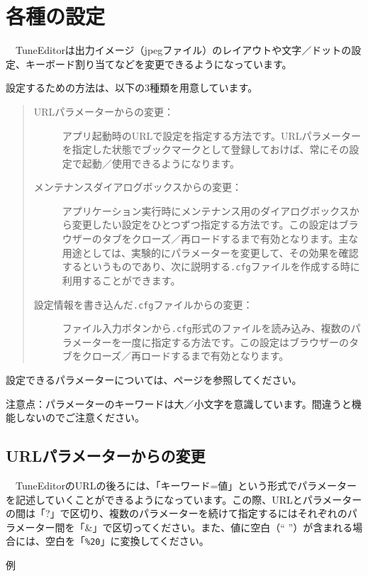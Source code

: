 \chapter{各種の設定}

　TuneEditorは出力イメージ（jpegファイル）のレイアウトや文字／ドットの設定、キーボード割り当てなどを変更できるようになっています。

設定するための方法は、以下の3種類を用意しています。

\begin{quote}
\begin{description}
\item[URLパラメーターからの変更：] アプリ起動時のURLで設定を指定する方法です。URLパラメーターを指定した状態でブックマークとして登録しておけば、常にその設定で起動／使用できるようになります。
\item[メンテナンスダイアログボックスからの変更：] アプリケーション実行時にメンテナンス用のダイアログボックスから変更したい設定をひとつずつ指定する方法です。この設定はブラウザーのタブをクローズ／再ロードするまで有効となります。主な用途としては、実験的にパラメーターを変更して、その効果を確認するというものであり、次に説明する\texttt{.cfg}ファイルを作成する時に利用することができます。
\item[設定情報を書き込んだ\texttt{.cfg}ファイルからの変更：] ファイル入力ボタンから\texttt{.cfg}形式のファイルを読み込み、複数のパラメーターを一度に指定する方法です。この設定はブラウザーのタブをクローズ／再ロードするまで有効となります。
\end{description}
\end{quote}

設定できるパラメーターについては、\pageref{Parameters}ページを参照してください。

\textsf{注意点：}パラメーターのキーワードは大／小文字を意識しています。間違うと機能しないのでご注意ください。

\section{URLパラメーターからの変更}

　TuneEditorのURLの後ろには、「\textsf{キーワード}=\textsf{値}」という形式でパラメーターを記述していくことができるようになっています。この際、URLとパラメーターの間は「?」で区切り、複数のパラメーターを続けて指定するにはそれぞれのパラメーター間を「\&」で区切ってください。また、値に空白（`` ''）が含まれる場合には、空白を「\texttt{\%20}」に変換してください。

\textsf{例}


